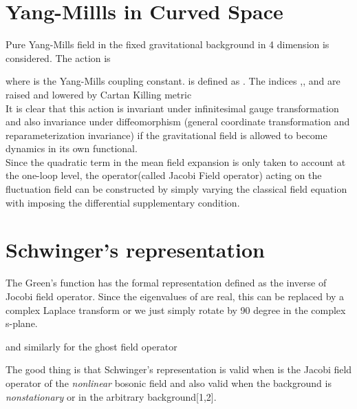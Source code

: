 \documentclass[a4paper,12 pt]{article}
\begin{document}
\section{Yang-Millls in Curved Space}
Pure Yang-Mills field in the fixed gravitational background in 4
dimension is considered. The action is
\begin{center}
  \coordHE{}
\end{center}
 where \coordHE{} is the Yang-Mills coupling constant.
 \myHighlight{$g$}\coordHE{} is
 defined as \coordHE{}. The indices \coordHE{},\coordHE{}, and \coordHE{} are
 raised and lowered by Cartan Killing metric \myHighlight{$\gamma_{ab}$}\coordHE{}
 \\ It is clear that this action is invariant under
 infinitesimal gauge transformation and also invariance under
 diffeomorphism (general coordinate transformation and reparameterization invariance)
 if the gravitational field is allowed to become dynamics in its
 own functional.\\
 Since the
 quadratic term in the mean field expansion is only taken to
 account at the one-loop level, the operator(called Jacobi Field operator)
 acting on the fluctuation field
 can be constructed by simply varying the classical field equation with
 imposing the differential supplementary condition.

\section{Schwinger's representation}
The Green's function has the formal representation defined as the
inverse of Jocobi field operator. Since the eigenvalues of
\coordHE{} are real, this can be replaced by a complex Laplace
transform or we just simply rotate by 90 degree in the complex
s-plane.
\begin{center}
\myHighlight{$G = -\frac{1}{\hat{F}+i\epsilon} = i\int_{o}^{\infty}e^{i \hat{F}
s} ds$}\coordHE{}
\end{center}
and similarly for the ghost field operator
\begin{center}
\coordHE{}
\end{center}

 The good thing is that Schwinger's representation is valid when
  \myHighlight{$\hat{F}$}\coordHE{} is the Jacobi field
 operator of the {\it nonlinear} bosonic field and also valid when the
 background is {\it nonstationary} or in the
 arbitrary background[1,2].
\end{document}
